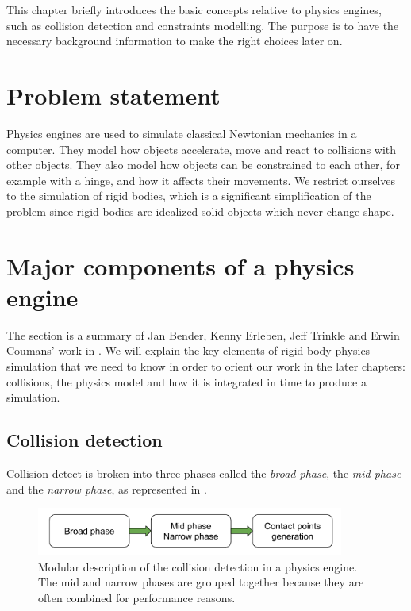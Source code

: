 This chapter briefly introduces the basic concepts relative to physics engines, such as collision detection and constraints modelling. The purpose is to have the necessary background information to make the right choices later on.

\section{Problem statement}
Physics engines are used to simulate classical Newtonian mechanics in a computer. They model how objects accelerate, move and react to collisions with other objects. They also model how objects can be constrained to each other, for example with a hinge, and how it affects their movements. We restrict ourselves to the simulation of rigid bodies, which is a significant simplification of the problem since rigid bodies are idealized solid objects which never change shape.

\section{Major components of a physics engine}
The section is a summary of Jan Bender, Kenny Erleben, Jeff Trinkle and Erwin Coumans' work in \cite{BETC2012}. We will explain the key elements of rigid body physics simulation that we need to know in order to orient our work in the later chapters: collisions, the physics model and how it is integrated in time to produce a simulation.

\subsection{Collision detection \label{sec:collision}}
Collision detect is broken into three phases called the \emph{broad phase}, the \emph{mid phase} and the \emph{narrow phase}, as represented in .

\begin{figure}
	\centering
	\includegraphics[width=0.9\textwidth]{figures/STAR_collision_v2}
	\caption[Collision detection]{Modular description of the collision detection in a physics engine. The mid and narrow phases are grouped together because they are often combined for performance reasons.}
	\label{fig:star_collision}
\end{figure}

